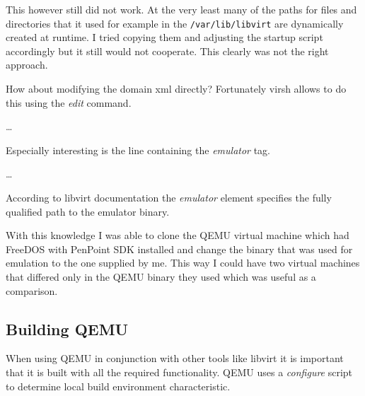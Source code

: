 This however still did not work.  At the very least many of the paths for files
and directories that it used for example in the \lstinline{/var/lib/libvirt} are
dynamically created at runtime.  I tried copying them and adjusting the startup
script accordingly but it still would not cooperate.  This clearly was not the
right approach.

How about modifying the domain xml directly?  Fortunately virsh allows to do
this using the \emph{edit} command.

\begin{codeblock}
    

    \dots

    
\end{codeblock}

\noindent
Especially interesting is the line containing the \emph{emulator} tag.

\begin{codeblock}
    
    
    \dots

    
\end{codeblock}

\noindent
According to libvirt documentation \cite{libvirt} the \emph{emulator} element
specifies the fully qualified path to the emulator binary.

With this knowledge I was able to clone the QEMU virtual machine which had
FreeDOS with PenPoint SDK installed and change the binary that was used for
emulation to the one supplied by me.  This way I could have two virtual machines
that differed only in the QEMU binary they used which was useful as
a comparison.

\subsection{Building QEMU} %


When using QEMU in conjunction with other tools like libvirt it is important
that it is built with all the required functionality.  QEMU uses
a \emph{configure} script to determine local build environment characteristic.

